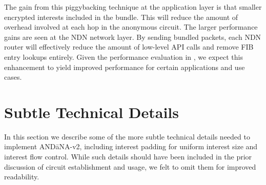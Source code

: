 \documentclass[10pt]{article}
\begin{document}
The gain from this piggybacking technique at the application layer is that smaller encrypted interests included in the bundle. This will reduce the amount of overhead involved at each hop in the anonymous circuit. The larger performance gains are seen at the NDN network layer. By sending bundled packets, each NDN router will effectively reduce the amount of low-level API calls and remove FIB entry lookups entirely. Given the performance evaluation in \cite{piggyback}, we expect this enhancement to yield improved performance for certain applications and use cases.


\section{Subtle Technical Details} \label{sec:details}
In this section we describe some of the more subtle technical details needed to implement {\sf AND\=aNA-v2}, including interest padding for uniform interest size and interest flow control. While such details should have been included in the prior discussion of circuit establishment and usage, we felt to omit them for improved readability.
\end{document}
